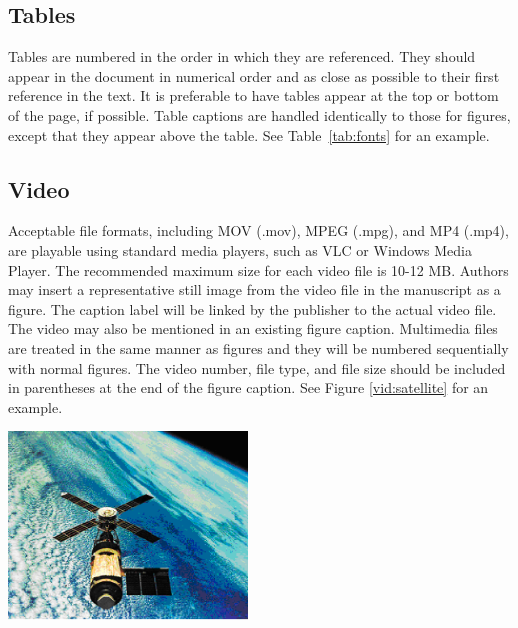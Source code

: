 \documentclass[12pt]{spieman}  %
\begin{document}
\begin{spacing}{2}
\subsection{Tables}
Tables are numbered in the order in which they are referenced. They should appear in the document in numerical order and as close as possible to their first reference in the text. It is preferable to have tables appear at the top or bottom of the page, if possible. Table captions are handled identically to those for figures, except that they appear above the table. See Table~\ref{tab:fonts} for an example.

\subsection{Video}
Acceptable file formats, including MOV (.mov), MPEG (.mpg), and MP4 (.mp4), are playable using standard media players, such as VLC or Windows Media Player. The recommended maximum size for each video file is 10-12 MB. Authors may insert a representative still image from the video file in the manuscript as a figure. The caption label will be linked by the publisher to the actual video file. The video may also be mentioned in an existing figure caption. Multimedia files are treated in the same manner as figures and they will be numbered sequentially with normal figures.  The video number, file type, and file size should be included in parentheses at the end of the figure caption. See Figure \ref{vid:satellite} for an example.

\begin{video}
\begin{center}
{\includegraphics[height=5cm]{satellite.eps}}
\\
\end{center}
\caption{\label{vid:satellite}This satellite is a still image from Video 1 (Video 1, MPEG, 2.5 MB).}
\end{video}

\appendix    %


\end{spacing}
\end{document}
